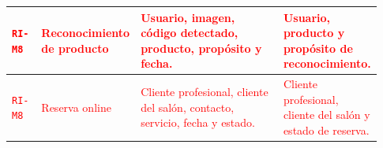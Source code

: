 {\begin{longtable}{|>{\RaggedRight\arraybackslash}p{0.08\linewidth}|>{\RaggedRight\arraybackslash}p{0.22\linewidth}|>{\RaggedRight\arraybackslash}p{0.40\linewidth}|>{\RaggedRight\arraybackslash}p{0.23\linewidth}|}
\hline
\textcolor{red}{\texttt{RI-M8}} & \textcolor{red}{Reconocimiento de producto} & \textcolor{red}{Usuario, imagen, código detectado, producto, propósito y fecha.} & \textcolor{red}{Usuario, producto y propósito de reconocimiento.} \\
\hline
\textcolor{red}{\texttt{RI-M8}} & \textcolor{red}{Reserva online} & \textcolor{red}{Cliente profesional, cliente del salón, contacto, servicio, fecha y estado.} & \textcolor{red}{Cliente profesional, cliente del salón y estado de reserva.} \\
\hline
\end{longtable}
}
